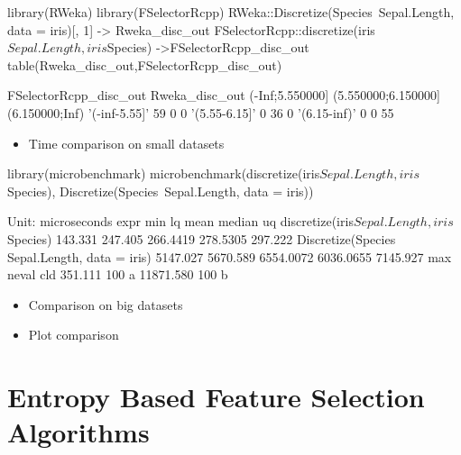 \begin{Schunk}
\begin{Sinput}
library(RWeka)
library(FSelectorRcpp)
RWeka::Discretize(Species~Sepal.Length, data = iris)[, 1] -> Rweka_disc_out
FSelectorRcpp::discretize(iris$Sepal.Length, iris$Species) ->FSelectorRcpp_disc_out
table(Rweka_disc_out,FSelectorRcpp_disc_out)
\end{Sinput}
\begin{Soutput}
               FSelectorRcpp_disc_out
Rweka_disc_out  (-Inf;5.550000] (5.550000;6.150000] (6.150000;Inf)
  '(-inf-5.55]'              59                   0              0
  '(5.55-6.15]'               0                  36              0
  '(6.15-inf)'                0                   0             55
\end{Soutput}
\end{Schunk}

\begin{itemize}
\tightlist
\item
  Time comparison on small datasets
\end{itemize}

\begin{Schunk}
\begin{Sinput}
library(microbenchmark)
microbenchmark(discretize(iris$Sepal.Length, iris$Species),
               Discretize(Species~Sepal.Length, data = iris))
\end{Sinput}
\begin{Soutput}
Unit: microseconds
                                            expr      min       lq      mean    median       uq
     discretize(iris$Sepal.Length, iris$Species)  143.331  247.405  266.4419  278.5305  297.222
 Discretize(Species ~ Sepal.Length, data = iris) 5147.027 5670.589 6554.0072 6036.0655 7145.927
       max neval cld
   351.111   100  a 
 11871.580   100   b
\end{Soutput}
\end{Schunk}

\begin{itemize}
\item
  Comparison on big datasets
\item
  Plot comparison
\end{itemize}

\section{Entropy Based Feature Selection
Algorithms}\label{entropy-based-feature-selection-algorithms}

